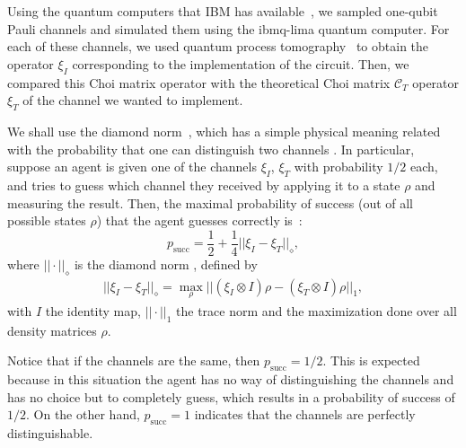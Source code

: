 \documentclass[10pt,letterpaper]{article} %
\renewcommand{\succ}{\textrm{succ}}
\begin{document}
Using the quantum computers that IBM has available~\cite{Qiskit}, we sampled
one-qubit Pauli channels and simulated them using the ibmq-lima quantum
computer.  For each of these channels, we used quantum process
tomography~\cite{Qiskit, Chuang:1996} to obtain the 
operator $\xi_I$ corresponding to the implementation of the
circuit.  Then, we compared this {\color{red}
Choi matrix} {\color{orange} operator} with the theoretical {\color{red} Choi
matrix $\mathcal{C}_T$} {\color{orange} operator $\xi_T$} of the channel we
wanted to implement.  


We shall use the diamond norm~\cite{Aharonov,Wilde}, which has a simple physical meaning related
with the probability that one can distinguish two channels  
.
In particular, suppose an agent is given one of the channels $\xi_I$, $\xi_T$
with probability $1/2$ each,
and tries to guess which channel they received
by applying it to a state $\rho$ and measuring the result.
Then, the maximal probability of success (out of all possible states $\rho$) that
the agent guesses correctly is~\cite{Benenti}:
\begin{equation}
\label{eq: probability-success}
p_{\succ} = \dfrac{1}{2}+ \dfrac{1}{4} ||\xi_I - \xi_T ||_{\diamond},
\end{equation}
where $|| \cdot ||_{\diamond}$ is the diamond norm   {\color{orange}, defined by 
\begin{align*}
||\xi_I - \xi_T ||_{\diamond}  = \max_{\rho} || (\xi_I \otimes I) \rho - (\xi_T \otimes I) \rho ||_1,
\end{align*}
with $I$ the identity map,
$|| \cdot ||_1$ the trace norm and the maximization
done over all density matrices $\rho$.} 
   
Notice that if the channels are the same, then $p_{\succ}=1/2$. 
This is expected because in this situation the agent
has no way of distinguishing the channels and has no choice but to completely
guess, which results in a probability of success of $1/2$.
On the other hand, $p_{\succ}=1$ indicates that the channels are perfectly
distinguishable.
\end{document}
